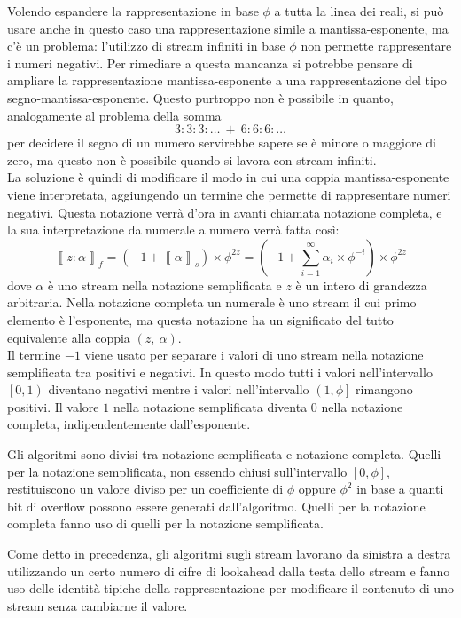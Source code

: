 \documentclass[Lau]{sapthesis}
\begin{document}
Volendo espandere la rappresentazione in base $\phi$ a tutta la linea dei reali, si può usare anche in questo caso una rappresentazione simile a mantissa-esponente, ma c'è un problema: l'utilizzo di stream infiniti in base $\phi$ non permette rappresentare i numeri negativi. Per rimediare a questa mancanza si potrebbe pensare di ampliare la rappresentazione mantissa-esponente a una rappresentazione del tipo segno-mantissa-esponente. Questo purtroppo non è possibile in quanto, analogamente al problema della somma
$$3:3:3:\ldots \ + \ 6:6:6:\ldots$$
per decidere il segno di un numero servirebbe sapere se è minore o maggiore di zero, ma questo non è possibile quando si lavora con stream infiniti.\\
La soluzione è quindi di modificare il modo in cui una coppia mantissa-esponente viene interpretata, aggiungendo un termine che permette di rappresentare numeri negativi. Questa notazione verrà d'ora in avanti chiamata notazione completa, e la sua interpretazione da numerale a numero verrà fatta così:
$$\left\llbracket z:\alpha \right\rrbracket_f = \left( -1 + \left\llbracket \alpha \right\rrbracket_s \right) \times \phi^{2z} = \left( -1 + \sum_{i=1}^{\infty} \alpha_i \times \phi^{-i} \right) \times \phi^{2z}$$
dove $\alpha$ è uno stream nella notazione semplificata e $z$ è un intero di grandezza arbitraria. Nella notazione completa un numerale è uno stream il cui primo elemento è l'esponente, ma questa notazione ha un significato del tutto equivalente alla coppia $(z, \ \alpha)$.\\
Il termine $-1$ viene usato per separare i valori di uno stream nella notazione semplificata tra positivi e negativi. In questo modo tutti i valori nell'intervallo $\left[0,1\right)$ diventano negativi mentre i valori nell'intervallo $\left(1,\phi\right]$ rimangono positivi. Il valore $1$ nella notazione semplificata diventa $0$ nella notazione completa, indipendentemente dall'esponente.

Gli algoritmi sono divisi tra notazione semplificata e notazione completa. Quelli per la notazione semplificata, non essendo chiusi sull'intervallo $\left[0,\phi\right]$, restituiscono un valore diviso per un coefficiente di $\phi$ oppure $\phi^2$ in base a quanti bit di overflow possono essere generati dall'algoritmo. Quelli per la notazione completa fanno uso di quelli per la notazione semplificata.

Come detto in precedenza, gli algoritmi sugli stream lavorano da sinistra a destra utilizzando un certo numero di cifre di lookahead dalla testa dello stream e fanno uso delle identità tipiche della rappresentazione per modificare il contenuto di uno stream senza cambiarne il valore.
\end{document}
